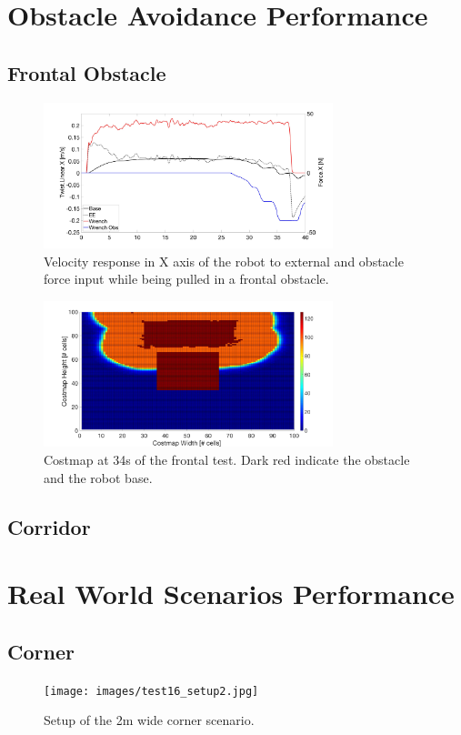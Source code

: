 \section{Obstacle Avoidance Performance}
\subsection{Frontal Obstacle}
\begin{figure}
   \centering
   \includegraphics[width=0.75\textwidth]{images/test2.jpg}
   \caption{Velocity response in X axis of the robot to external and obstacle force input while being pulled in a frontal obstacle.}
   \label{pics:test2}
\end{figure}

\begin{figure}
   \centering
   \includegraphics[width=0.75\textwidth]{images/test2_costmap.jpg}
   \caption{Costmap at \unit{34}{s} of the frontal test. Dark red indicate the obstacle and the robot base.}
   \label{pics:test2costmap}
\end{figure}



\subsection{Corridor}
\section{Real World Scenarios Performance}
\subsection{Corner}
\begin{figure}
   \centering
   \texttt{[image: images/test16\_setup2.jpg]}
   \caption{Setup of the \unit{2}{m} wide corner scenario.}
   \label{pics:test16_setup}
\end{figure}

